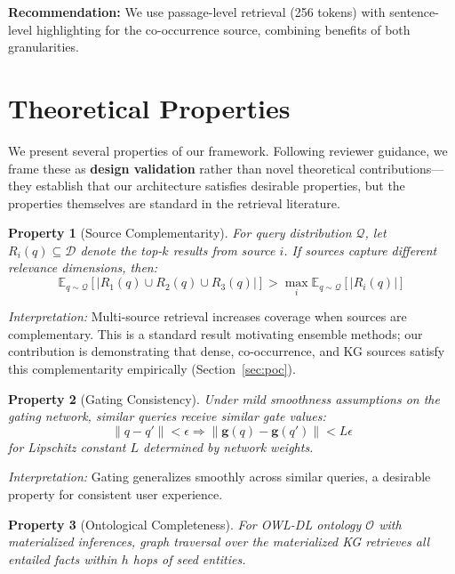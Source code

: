 \documentclass[11pt,a4paper]{article}
\newtheorem{property}{Property}
\begin{document}
\textbf{Recommendation:} We use passage-level retrieval (256 tokens) with sentence-level highlighting for the co-occurrence source, combining benefits of both granularities.

\section{Theoretical Properties}
\label{sec:properties}

We present several properties of our framework. Following reviewer guidance, we frame these as \textbf{design validation} rather than novel theoretical contributions---they establish that our architecture satisfies desirable properties, but the properties themselves are standard in the retrieval literature.

\begin{property}[Source Complementarity]
\label{prop:complementarity}
For query distribution $\mathcal{Q}$, let $R_i(q) \subseteq \mathcal{D}$ denote the top-$k$ results from source $i$. If sources capture different relevance dimensions, then:
\begin{equation}
\mathbb{E}_{q \sim \mathcal{Q}}\left[|R_1(q) \cup R_2(q) \cup R_3(q)|\right] > \max_i \mathbb{E}_{q \sim \mathcal{Q}}\left[|R_i(q)|\right]
\end{equation}
\end{property}

\textit{Interpretation:} Multi-source retrieval increases coverage when sources are complementary. This is a standard result motivating ensemble methods; our contribution is demonstrating that dense, co-occurrence, and KG sources satisfy this complementarity empirically (Section~\ref{sec:poc}).

\begin{property}[Gating Consistency]
\label{prop:gating}
Under mild smoothness assumptions on the gating network, similar queries receive similar gate values:
\begin{equation}
\|q - q'\| < \epsilon \Rightarrow \|\mathbf{g}(q) - \mathbf{g}(q')\| < L\epsilon
\end{equation}
for Lipschitz constant $L$ determined by network weights.
\end{property}

\textit{Interpretation:} Gating generalizes smoothly across similar queries, a desirable property for consistent user experience.

\begin{property}[Ontological Completeness]
\label{prop:owl}
For OWL-DL ontology $\mathcal{O}$ with materialized inferences, graph traversal over the materialized KG retrieves all entailed facts within $h$ hops of seed entities.
\end{property}
\end{document}
